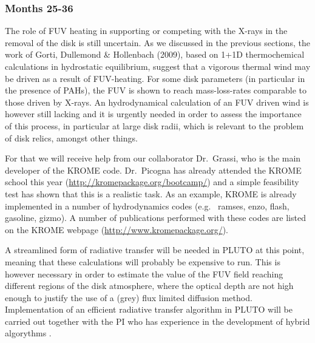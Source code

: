 \documentclass[10pt,fleqn,twoside]{article}
\begin{document}
\subsubsection{Months 25-36} 
The role of FUV heating in supporting or competing with the X-rays in
the removal of the disk is still uncertain. As we discussed in the
previous sections, the work of Gorti, Dullemond \& Hollenbach
(2009), based on 1+1D thermochemical calculations in hydrostatic
equilibrium, suggest that a vigorous thermal wind may be driven as a
result of FUV-heating. For some disk parameters (in particular in the
presence of PAHs), the FUV is shown to reach mass-loss-rates
comparable to those driven by X-rays. An hydrodynamical calculation of
an FUV driven wind is however still lacking and it is urgently needed
in order to assess the importance of this process, in particular at
large disk radii, which is relevant to the problem of disk relics,
amongst other things. 

 For 
that we will receive help from our collaborator Dr.\ Grassi, who is the main
developer of the KROME code. Dr.\ Picogna has already attended the KROME
school this year (\url{http://kromepackage.org/bootcamp/}) and a simple
feasibility test has shown that this is a realistic task. As an example,
KROME is already implemented in a number of hydrodynamics codes (e.g.\ {\sc
  ramses, enzo, flash, gasoline, gizmo}). A number of publications performed
with these codes are listed on the KROME webpage
(\url{http://www.kromepackage.org/}).

A streamlined form of radiative transfer
will be needed in PLUTO at this point, meaning that these calculations will
probably be expensive to run.  This is however necessary in order to
estimate the value of the  FUV field reaching different regions of the
disk atmosphere, where the optical depth are not high enough to
justify the use of a  (grey) flux limited diffusion method.
Implementation of an efficient radiative transfer algorithm in PLUTO
will be carried out together with the PI who has experience in the
development of hybrid algorythms 
\citep[e.g.,][]{2014ASSP...36..127O}.
\end{document}
